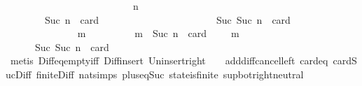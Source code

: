 \begin{isabellebody}
\ \ \ \ \ \ \ \ \ \ \isamarkupfalse%
\ {\isacharminus}\isanewline
\ \ \ \ \ \ \ \ \ \ \ \ \isamarkupfalse%
\ n\ {\isasymsigma}\ {\isasymsigma}{\isacharprime}\isanewline
\ \ \ \ \ \ \ \ \ \ \ \ \isamarkupfalse%
\ {\isachardoublequoteopen}{\isasymforall}{\isasymsigma}{\isasymin}{\isasymSigma}{\isachardot}\ {\isasymforall}{\isasymsigma}{\isacharprime}{\isasymin}{\isasymSigma}{\isachardot}\ {\isasymnot}\ {\isasymsigma}\ {\isasymsubseteq}\ {\isasymsigma}{\isacharprime}\ {\isasymand}\ Suc\ n\ {\isacharequal}\ card\ {\isacharparenleft}{\isasymsigma}\ {\isacharminus}\ {\isasymsigma}{\isacharprime}{\isacharparenright}\ {\isasymlongrightarrow}\ {\isasymsigma}\ {\isasymunion}\ {\isasymsigma}{\isacharprime}\ {\isasymin}\ {\isasymSigma}{\isachardoublequoteclose}\ \ {\isachardoublequoteopen}{\isasymsigma}\ {\isasymin}\ {\isasymSigma}{\isachardoublequoteclose}\ \ {\isachardoublequoteopen}{\isasymsigma}{\isacharprime}\ {\isasymin}\ {\isasymSigma}{\isachardoublequoteclose}\ \ {\isachardoublequoteopen}{\isasymnot}\ {\isasymsigma}\ {\isasymsubseteq}\ {\isasymsigma}{\isacharprime}\ {\isasymand}\ Suc\ {\isacharparenleft}Suc\ n{\isacharparenright}\ {\isacharequal}\ card\ {\isacharparenleft}{\isasymsigma}\ {\isacharminus}\ {\isasymsigma}{\isacharprime}{\isacharparenright}{\isachardoublequoteclose}\ \isanewline
\ \ \ \ \ \ \ \ \ \ \ \ \isamarkupfalse%
\ {\isachardoublequoteopen}{\isasymforall}\ m\ {\isasymin}\ {\isasymsigma}\ {\isacharminus}\ {\isasymsigma}{\isacharprime}{\isachardot}\ {\isasymnot}\ {\isasymsigma}\ {\isasymsubseteq}\ {\isasymsigma}{\isacharprime}\ {\isasymunion}\ {\isacharbraceleft}m{\isacharbraceright}\ {\isasymand}\ Suc\ n\ {\isacharequal}\ card\ {\isacharparenleft}{\isasymsigma}\ {\isacharminus}\ {\isacharparenleft}{\isasymsigma}{\isacharprime}\ {\isasymunion}\ {\isacharbraceleft}m{\isacharbraceright}{\isacharparenright}{\isacharparenright}{\isachardoublequoteclose}\isanewline
\ \ \ \ \ \ \ \ \ \ \ \ \ \ \isamarkupfalse%
\ {\isacartoucheopen}{\isasymnot}\ {\isasymsigma}\ {\isasymsubseteq}\ {\isasymsigma}{\isacharprime}\ {\isasymand}\ Suc\ {\isacharparenleft}Suc\ n{\isacharparenright}\ {\isacharequal}\ card\ {\isacharparenleft}{\isasymsigma}\ {\isacharminus}\ {\isasymsigma}{\isacharprime}{\isacharparenright}{\isacartoucheclose}\ \isanewline
\ \ \ \ \ \ \ \ \ \ \ \ \ \ \isamarkupfalse%
\ {\isacharparenleft}metis\ Diff{\isacharunderscore}eq{\isacharunderscore}empty{\isacharunderscore}iff\ Diff{\isacharunderscore}insert\ Un{\isacharunderscore}insert{\isacharunderscore}right\ {\isacartoucheopen}{\isasymsigma}\ {\isasymin}\ {\isasymSigma}{\isacartoucheclose}\ add{\isacharunderscore}diff{\isacharunderscore}cancel{\isacharunderscore}left{\isacharprime}\ card{\isacharunderscore}{}{\isacharunderscore}eq\ card{\isacharunderscore}Suc{\isacharunderscore}Diff{}\ finite{\isacharunderscore}Diff\ nat{\isachardot}simps{\isacharparenleft}{}{\isacharparenright}\ plus{\isacharunderscore}{}{\isacharunderscore}eq{\isacharunderscore}Suc\ state{\isacharunderscore}is{\isacharunderscore}finite\ sup{\isacharunderscore}bot{\isachardot}right{\isacharunderscore}neutral{\isacharparenright}\isanewline

\end{isabellebody}
